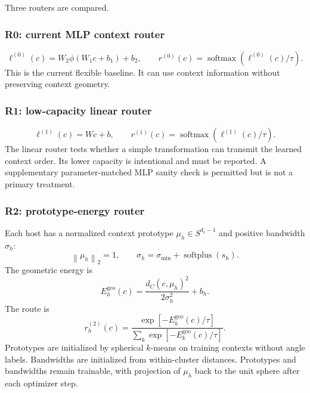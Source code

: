 \documentclass[11pt,a4paper]{article}
\newcommand{\norm}[1]{\left\lVert #1 \right\rVert}
\newcommand{\softmax}{\operatorname{softmax}}
\begin{document}
Three routers are compared.

\subsubsection{R0: current MLP context router}

\begin{equation}
 \ell^{(0)}(c)=W_2\phi(W_1c+b_1)+b_2,
 \qquad r^{(0)}(c)=\softmax\left(\ell^{(0)}(c)/\tau\right).
\end{equation}
This is the current flexible baseline. It can use context information without preserving context geometry.

\subsubsection{R1: low-capacity linear router}

\begin{equation}
 \ell^{(1)}(c)=Wc+b,
 \qquad r^{(1)}(c)=\softmax\left(\ell^{(1)}(c)/\tau\right).
\end{equation}
The linear router tests whether a simple transformation can transmit the learned context order. Its lower capacity is intentional and must be reported. A supplementary parameter-matched MLP sanity check is permitted but is not a primary treatment.

\subsubsection{R2: prototype-energy router}

Each host has a normalized context prototype $\mu_h\in S^{d_c-1}$ and positive bandwidth $\sigma_h$:
\begin{equation}
 \norm{\mu_h}_2=1,
 \qquad \sigma_h=\sigma_{\min}+\operatorname{softplus}(s_h).
\end{equation}
The geometric energy is
\begin{equation}
 E_h^{\mathrm{geo}}(c)=
 \frac{d_C(c,\mu_h)^2}{2\sigma_h^2}+b_h.
\end{equation}
The route is
\begin{equation}
 r_h^{(2)}(c)=
 \frac{\exp[-E_h^{\mathrm{geo}}(c)/\tau]}
 {\sum_k\exp[-E_k^{\mathrm{geo}}(c)/\tau]}.
\end{equation}
Prototypes are initialized by spherical $k$-means on training contexts without angle labels. Bandwidths are initialized from within-cluster distances. Prototypes and bandwidths remain trainable, with projection of $\mu_h$ back to the unit sphere after each optimizer step.
\end{document}
